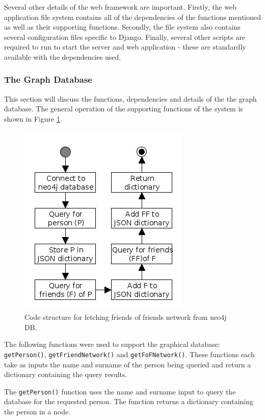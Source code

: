 \documentclass[12pt,onecolumn]{article}
\begin{document}
	Several other details of the web framework are important. Firstly, the web application file system contains all of the dependencies of the functions mentioned as well as their supporting functions. Secondly, the file system also contains several configuration files specific to Django. Finally, several other scripts are required to run to start the server and web application - these are standardly available with the dependencies used.
	
	\subsubsection{The Graph Database}
	This section will discuss the functions, dependencies and details of the the graph database. The general operation of the supporting functions of the system is shown in Figure \ref{fig:db}.
	
	\begin{figure} [htb]
		\centering
		\includegraphics[scale=1]{neo4jdb}
		\caption{Code structure for fetching friends of friends network from neo4j DB.} \label{fig:db}
	\end{figure}
	
	The following functions were used to support the graphical database: \texttt{getPerson()}, \texttt{getFriendNetwork()} and \texttt{getFoFNetwork()}. These functions each take as inputs the name and surname of the person being queried and return a dictionary containing the query results. 
	
	The \texttt{getPerson()} function uses the name and surname input to query the database for the requested person. The function returns a dictionary containing the person in a node.
	
\end{document}
